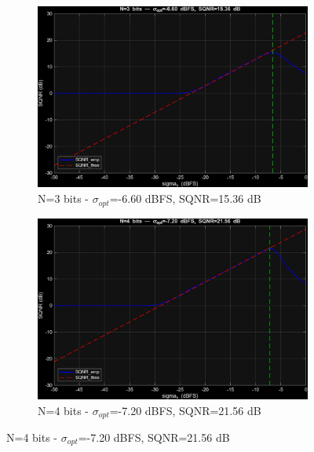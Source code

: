 \documentclass[11pt,a4paper]{article}
\begin{document}
\begin{figure}[H]
    \begin{subfigure}[t]{.4\textwidth}
        \centering
        \includegraphics[width=\linewidth]{img/task3_tri_n3.png}
        \caption{N=3 bits - $\sigma_{opt}$=-6.60 dBFS, SQNR=15.36 dB}
    \end{subfigure}
    \hfill
    \begin{subfigure}[t]{.4\textwidth}
        \centering
        \includegraphics[width=\linewidth]{img/task3_tri_n4.png}
        \caption{N=4 bits - $\sigma_{opt}$=-7.20 dBFS, SQNR=21.56 dB}
    \end{subfigure}

    \medskip


\end{figure}
\end{document}

